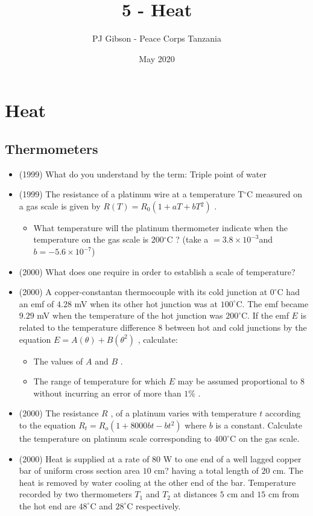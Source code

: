 \documentclass{article}
\title{\textbf{5 - Heat}}
\author{PJ Gibson - Peace Corps Tanzania}
\date{May 2020}
\newcommand{\mysection}[2]{\setcounter{section}{#1}\addtocounter{section}{-1}\section{#2}}
\begin{document}
\maketitle


\mysection{5}{Heat}

\subsection{Thermometers}
\begin{itemize}
\item (1999)  What do you understand by the term:   Triple point of water
\item (1999)  The resistance of a platinum wire at a temperature T​$ ^{\circ}$C measured on a gas scale is given by $ R(T)=R​_{0​}(1+ a T+bT​^{2}​)$ .
 \begin{itemize}
\item What temperature will the platinum thermometer indicate when the temperature on the gas scale is $ 200​^{\circ}$C ? (take a $ =3.8 \times 10^{-3}$ ​ and $ b=-5.6 \times 10^{-7}$ ​)
\end{itemize}
\item (2000)  What does one require in order to establish a scale of temperature?
\item (2000)  A copper-constantan thermocouple with its cold junction at $ 0^{\circ}$C had an emf of $ 4.28$ mV when its other hot junction was at $ 100^{\circ}$C. The emf became $ 9.29$ mV when the temperature of the hot junction was $ 200^{\circ}$C. If the emf $ E$ is related to the temperature difference $ 8$ between hot and cold junctions by the equation $ E= A(\theta )+B(\theta ^{2})$ , calculate:
 \begin{itemize}
\item The values of $ A$ and $ B$ .
\item The range of temperature for which $ E$ may be assumed proportional to $ 8$ without incurring an error of more than $ 1\%$ .
\end{itemize}
\item (2000)  The resistance $ R$ , of a platinum varies with temperature $ t$ according to the equation $ R_{t}=R_{o}(1+8000bt -b t^{2})$ where $ b$ is a constant. Calculate the temperature on platinum scale corresponding to $ 400^{\circ}$C on the gas scale. 
\item (2000)  Heat is supplied at a rate of $ 80$ W to one end of a well lagged copper bar of uniform cross section area $ 10$ cm? having a total length of $ 20$ cm. The heat is removed by water cooling at the other end of the bar. Temperature recorded by two thermometers $ T_{1}$ and $ T_{2}$ at distances $ 5$ cm and $ 15$ cm from the hot end are $ 48^{\circ}$C and $ 28^{\circ}$C respectively.

\end{itemize}
\end{document}
